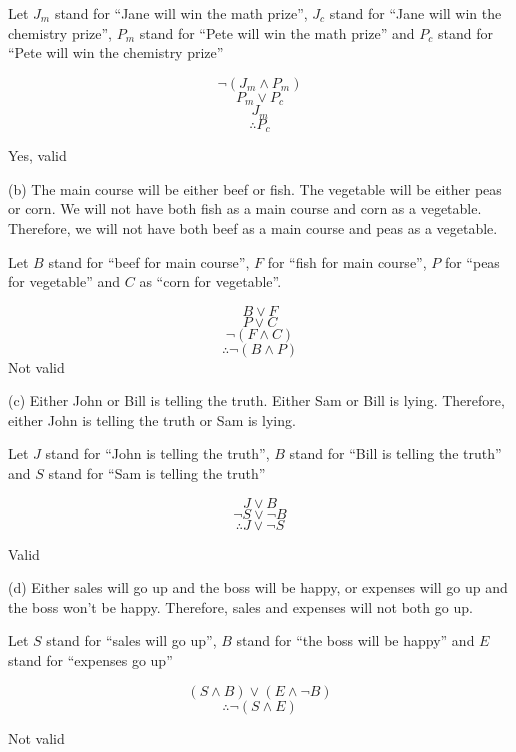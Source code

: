 \documentclass[11pt]{article}
\begin{document}
Let $J_m$ stand for ``Jane will win the math prize'', $J_c$ stand for ``Jane will win the chemistry prize'', $P_m$ stand for ``Pete will win the math prize'' and $P_c$ stand for ``Pete will win the chemistry prize''

$$\neg (J_m \wedge P_m) $$
$$P_m \vee P_c$$
$$J_m$$
$$ \therefore P_c$$

Yes, valid

\noindent (b) The main course will be either beef or fish. The vegetable will be either
peas or corn. We will not have both fish as a main course and corn as a
vegetable. Therefore, we will not have both beef as a main course and
peas as a vegetable.

Let $B$ stand for ``beef for main course'', $F$ for ``fish for main course'', $P$ for ``peas for vegetable'' and $C$ as ``corn for vegetable''.

$$B \vee F$$
$$P \vee C$$
$$\neg (F \wedge C)$$
$$\therefore \neg(B \wedge P)$$
Not valid

\noindent (c) Either John or Bill is telling the truth. Either Sam or Bill is lying. Therefore, either John is telling the truth or Sam is lying.

Let $J$ stand for ``John is telling the truth'', $B$ stand for ``Bill is telling the truth'' and $S$ stand for ``Sam is telling the truth''

$$J \vee B$$
$$\neg S \vee \neg B$$
$$\therefore J \vee \neg S$$

Valid

\noindent (d) Either sales will go up and the boss will be happy, or expenses will go up and the boss won’t be happy. Therefore, sales and expenses will not both go up.

Let $S$ stand for ``sales will go up'', $B$ stand for ``the boss will be happy'' and $E$ stand for ``expenses go up''

$$ (S \wedge B) \vee (E \wedge \neg B) $$
$$ \therefore \neg (S \wedge E) $$

Not valid
\end{document}
